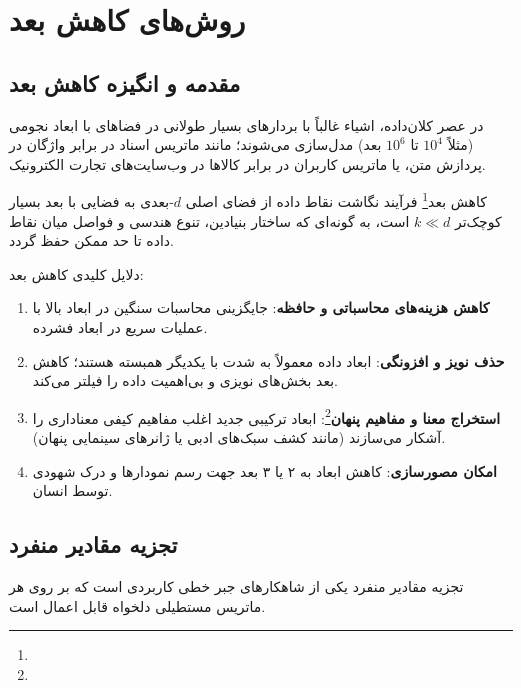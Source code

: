 \chapter{روش‌های کاهش بعد \texorpdfstring{}{(Dimensionality Reduction)}}
\label{ch:dimred}

\section{مقدمه و انگیزه کاهش بعد}
در عصر کلان‌داده، اشیاء غالباً با بردارهای بسیار طولانی در فضاهای با ابعاد نجومی (مثلاً $10^4$ تا $10^6$ بعد) مدل‌سازی می‌شوند؛ مانند ماتریس اسناد در برابر واژگان در پردازش متن، یا ماتریس کاربران در برابر کالاها در وب‌سایت‌های تجارت الکترونیک.

کاهش بعد\footnote{} فرآیند نگاشت نقاط داده از فضای اصلی $d$-بعدی به فضایی با بعد بسیار کوچک‌تر $k \ll d$ است، به گونه‌ای که ساختار بنیادین، تنوع هندسی و فواصل میان نقاط داده تا حد ممکن حفظ گردد.

دلایل کلیدی کاهش بعد:
\begin{enumerate}
    \item \textbf{کاهش هزینه‌های محاسباتی و حافظه}: جایگزینی محاسبات سنگین در ابعاد بالا با عملیات سریع در ابعاد فشرده.
    \item \textbf{حذف نویز و افزونگی}: ابعاد داده معمولاً به شدت با یکدیگر همبسته هستند؛ کاهش بعد بخش‌های نویزی و بی‌اهمیت داده را فیلتر می‌کند.
    \item \textbf{استخراج معنا و مفاهیم پنهان}\footnote{}: ابعاد ترکیبی جدید اغلب مفاهیم کیفی معناداری را آشکار می‌سازند (مانند کشف سبک‌های ادبی یا ژانرهای سینمایی پنهان).
    \item \textbf{امکان مصورسازی}: کاهش ابعاد به ۲ یا ۳ بعد جهت رسم نمودارها و درک شهودی توسط انسان.
\end{enumerate}

\section{تجزیه مقادیر منفرد \texorpdfstring{}{(Singular Value Decomposition - SVD)}}
تجزیه مقادیر منفرد  یکی از شاهکارهای جبر خطی کاربردی است که بر روی هر ماتریس مستطیلی دلخواه قابل اعمال است.


